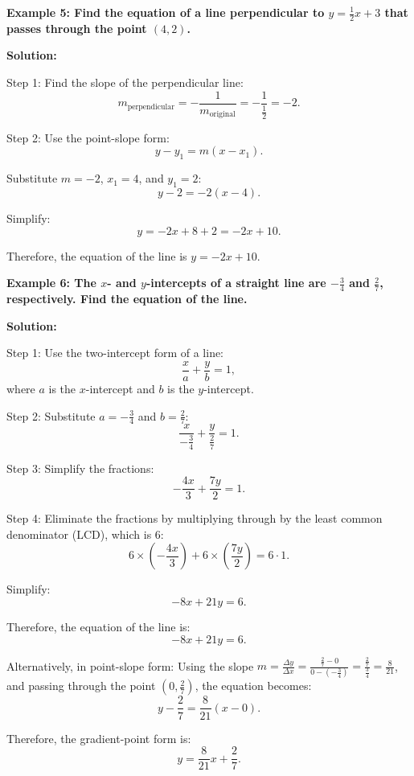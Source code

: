 \begin{flushleft}
	\textbf{Example 5: Find the equation of a line perpendicular to $y = \frac{1}{2}x + 3$ that passes through the point $(4, 2)$.}
	
	\vspace{0.5cm}
	\textbf{Solution:}
	\vspace{0.5cm}
	
	Step 1: Find the slope of the perpendicular line:
	\[
	m_{\text{perpendicular}} = -\frac{1}{m_{\text{original}}} = -\frac{1}{\frac{1}{2}} = -2.
	\]
	
	Step 2: Use the point-slope form:
	\[
	y - y_1 = m(x - x_1).
	\]
	
	Substitute $m = -2$, $x_1 = 4$, and $y_1 = 2$:
	\[
	y - 2 = -2(x - 4).
	\]
	
	Simplify:
	\[
	y = -2x + 8 + 2 = -2x + 10.
	\]
	
	Therefore, the equation of the line is $y = -2x + 10$.
\end{flushleft}

\begin{flushleft}
	\textbf{Example 6: The $x$- and $y$-intercepts of a straight line are $-\frac{3}{4}$ and $\frac{2}{7}$, respectively. Find the equation of the line.}
	
	\vspace{0.5cm}
	\textbf{Solution:}
	\vspace{0.5cm}
	
	Step 1: Use the two-intercept form of a line:
	\[
	\frac{x}{a} + \frac{y}{b} = 1,
	\]
	where $a$ is the $x$-intercept and $b$ is the $y$-intercept.
	
	Step 2: Substitute $a = -\frac{3}{4}$ and $b = \frac{2}{7}$:
	\[
	\frac{x}{-\frac{3}{4}} + \frac{y}{\frac{2}{7}} = 1.
	\]
	
	Step 3: Simplify the fractions:
	\[
	-\frac{4x}{3} + \frac{7y}{2} = 1.
	\]
	
	Step 4: Eliminate the fractions by multiplying through by the least common denominator (LCD), which is $6$:
	\[
	6 \times \left(-\frac{4x}{3}\right) + 6 \times \left(\frac{7y}{2}\right) = 6 \cdot 1.
	\]
	
	Simplify:
	\[
	-8x + 21y = 6.
	\]
	
	Therefore, the equation of the line is:
	\[
	-8x + 21y = 6.
	\]
	
	Alternatively, in point-slope form:
	Using the slope $m = \frac{\Delta y}{\Delta x} = \frac{\frac{2}{7} - 0}{0 - \left(-\frac{3}{4}\right)} = \frac{\frac{2}{7}}{\frac{3}{4}} = \frac{8}{21}$, and passing through the point $(0, \frac{2}{7})$, the equation becomes:
	\[
	y - \frac{2}{7} = \frac{8}{21}(x - 0).
	\]
	
	Therefore, the gradient-point form is:
	\[
	y = \frac{8}{21}x + \frac{2}{7}.
	\]
\end{flushleft}
